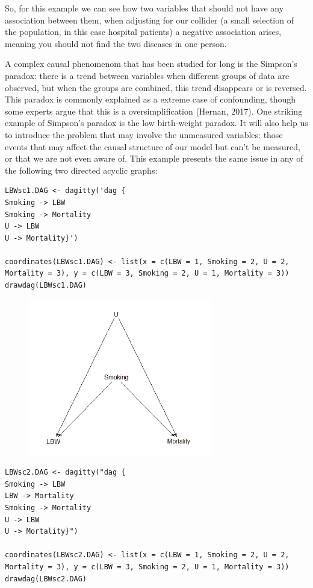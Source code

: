 \documentclass{article}
\begin{document}
So, for this example we can see how two variables that should not have any association between them, when adjusting for our collider (a small selection of the population, in this case hospital patients) a negative association arises, meaning you should not find the two diseases in one person.

A complex causal phenomenom that has been studied for long is the Simpson's paradox: there is a trend between variables when different groups of data are observed, but when the groups are combined, this trend disappears or is reversed. This paradox is commonly explained as a extreme case of confounding, though some experts argue that this is a oversimplification (Hernan, 2017).
One striking example of Simpson's paradox is the low birth-weight paradox. It will also help us to introduce the problem that may involve the unmeasured variables: those events that may affect the causal structure of our model but can't be measured, or that we are not even aware of. This example presents the same issue in any of the following two directed acyclic graphs:
\begin{lstlisting}
LBWsc1.DAG <- dagitty('dag {
Smoking -> LBW
Smoking -> Mortality
U -> LBW
U -> Mortality}')

coordinates(LBWsc1.DAG) <- list(x = c(LBW = 1, Smoking = 2, U = 2, Mortality = 3), y = c(LBW = 3, Smoking = 2, U = 1, Mortality = 3))
drawdag(LBWsc1.DAG)
\end{lstlisting}
\begin{figure}[h]
\includegraphics[width=8cm]{LBW1DAG.png}
\centering
\end{figure}
\newpage
\begin{lstlisting}
LBWsc2.DAG <- dagitty("dag {
Smoking -> LBW
LBW -> Mortality
Smoking -> Mortality
U -> LBW
U -> Mortality}")

coordinates(LBWsc2.DAG) <- list(x = c(LBW = 1, Smoking = 2, U = 2, Mortality = 3), y = c(LBW = 3, Smoking = 2, U = 1, Mortality = 3))
drawdag(LBWsc2.DAG)
\end{lstlisting}
\end{document}
